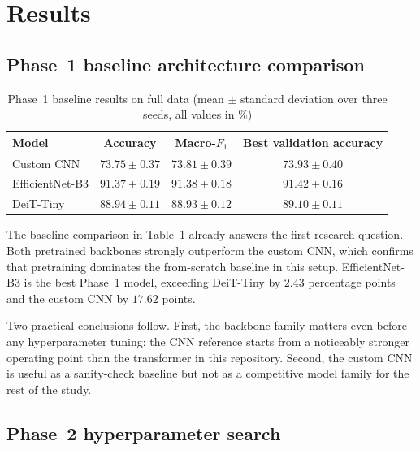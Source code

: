 \documentclass[12pt,a4paper]{article}
\begin{document}
\section{Results}
\label{sec:results}

\subsection{Phase~1 baseline architecture comparison}
\label{subsec:phase1-results}

\begin{table}[t!]
\centering
\caption{Phase~1 baseline results on full data (mean $\pm$ standard deviation over three seeds, all values in \%)}
\label{tab:phase1-results}
\smallskip
\small
\begin{tabular}{@{}lccc@{}}
\toprule
\textbf{Model} & \textbf{Accuracy} & \textbf{Macro-$F_1$} & \textbf{Best validation accuracy} \\
\midrule
Custom CNN & $73.75 \pm 0.37$ & $73.81 \pm 0.39$ & $73.93 \pm 0.40$ \\
EfficientNet-B3 & $\mathbf{91.37 \pm 0.19}$ & $\mathbf{91.38 \pm 0.18}$ & $\mathbf{91.42 \pm 0.16}$ \\
DeiT-Tiny & $88.94 \pm 0.11$ & $88.93 \pm 0.12$ & $89.10 \pm 0.11$ \\
\bottomrule
\end{tabular}
\end{table}

The baseline comparison in Table~\ref{tab:phase1-results} already answers the first research question. Both pretrained backbones strongly outperform the custom CNN, which confirms that pretraining dominates the from-scratch baseline in this setup. EfficientNet-B3 is the best Phase~1 model, exceeding DeiT-Tiny by $2.43$ percentage points and the custom CNN by $17.62$ points.

Two practical conclusions follow. First, the backbone family matters even before any hyperparameter tuning: the CNN reference starts from a noticeably stronger operating point than the transformer in this repository. Second, the custom CNN is useful as a sanity-check baseline but not as a competitive model family for the rest of the study.

\subsection{Phase~2 hyperparameter search}
\label{subsec:phase2-results}
\end{document}
